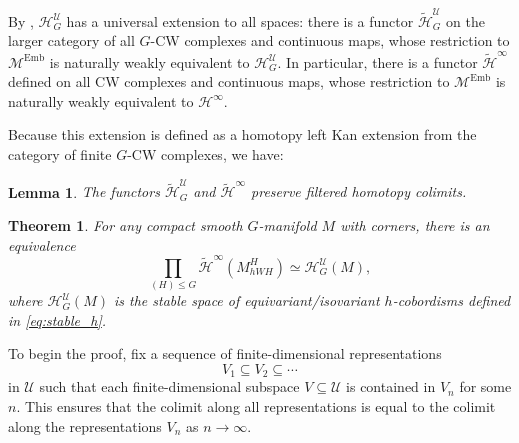 \documentclass[11pt]{amsart}
\newtheorem{thm}{Theorem}[section]
\newtheorem{lem}{Lemma}[section]
\theoremstyle{definition}
\numberwithin{equation}{section}
\numberwithin{figure}{section}
\newcommand{\mc}{\mathcal}
\newcommand{\Man}{\mc M^\mathrm{Emb}}
\begin{document}
By \cite[Theorem 7.14 and Corollary 7.18]{GIMM1}, $\mc H^{\mc U}_G$ has a universal extension to all spaces: there is a functor $\widetilde{\mc H}^{\mc U}_G$ on the larger category of all $G$-CW complexes and continuous maps, whose restriction to $\Man$ is naturally weakly equivalent to $\mc H^{\mc U}_G$. In particular, there is a functor $\widetilde{\mc H}^\infty$ defined on all CW complexes and continuous maps, whose restriction to $\Man$ is naturally weakly equivalent to $\mc H^\infty$. 

Because this extension is defined as a homotopy left Kan extension from the category of finite $G$-CW complexes, we have:
\begin{lem}
	The functors $\widetilde{\mc H}^{\mc U}_G$ and $\widetilde{\mc H}^\infty$ preserve filtered homotopy colimits.
\end{lem}

\begin{thm}\label{stable_splitting_thm}
	For any compact smooth $G$-manifold $M$ with corners, there is an equivalence
	\begin{equation*}\label{eq_stable_splitting}
	\prod_{(H) \leq G} \widetilde{\mc H}^\infty(M^{H}_{hWH}) \simeq \mc H^{\mc U}_G(M),
	\end{equation*}
	where $\mc H_G^{\mc U}(M)$ is the stable space of equivariant/isovariant $h$-cobordisms defined in \eqref{eq:stable_h}.
\end{thm}

To begin the proof, fix a sequence of finite-dimensional representations 
$$
V_1 \subseteq V_2 \subseteq \cdots
$$
in $\mc U$ such that each finite-dimensional subspace $V \subseteq \mc U$ is contained in $V_n$ for some $n$. This ensures that the colimit along all representations is equal to the colimit along the representations $V_n$ as $n \to \infty$.
\end{document}
